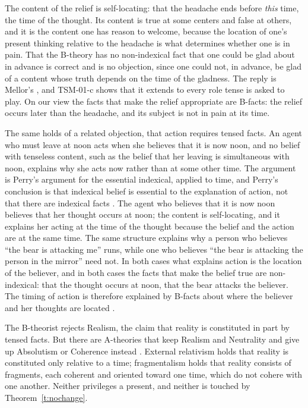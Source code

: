 \documentclass{situationist-preprint}
\begin{document}
\begin{reply}
The content of the relief is self-locating: that the headache ends before \emph{this} time, the time of the thought. Its content is true at some centers and false at others, and it is the content one has reason to welcome, because the location of one's present thinking relative to the headache is what determines whether one is in pain. That the B-theory has no non-indexical fact that one could be glad about in advance is correct and is no objection, since one could not, in advance, be glad of a content whose truth depends on the time of the gladness. The reply is Mellor's \citep{Mellor1998}, and TSM-01-c shows that it extends to every role tense is asked to play. On our view the facts that make the relief appropriate are B-facts: the relief occurs later than the headache, and its subject is not in pain at its time.

The same holds of a related objection, that action requires tensed facts. An agent who must leave at noon acts when she believes that it is now noon, and no belief with tenseless content, such as the belief that her leaving is simultaneous with noon, explains why she acts now rather than at some other time. The argument is Perry's argument for the essential indexical, applied to time, and Perry's conclusion is that indexical belief is essential to the explanation of action, not that there are indexical facts \citep{Perry1979}. The agent who believes that it is now noon believes that her thought occurs at noon; the content is self-locating, and it explains her acting at the time of the thought because the belief and the action are at the same time. The same structure explains why a person who believes \enquote{the bear is attacking me} runs, while one who believes \enquote{the bear is attacking the person in the mirror} need not. In both cases what explains action is the location of the believer, and in both cases the facts that make the belief true are non-indexical: that the thought occurs at noon, that the bear attacks the believer. The timing of action is therefore explained by B-facts about where the believer and her thoughts are located \citep{Mellor1998}.
\end{reply}

\begin{objection}\label{o:fine}
The B-theorist rejects Realism, the claim that reality is constituted in part by tensed facts. But there are A-theories that keep Realism and Neutrality and give up Absolutism or Coherence instead \citep{Fine2005}. External relativism holds that reality is constituted only relative to a time; fragmentalism holds that reality consists of fragments, each coherent and oriented toward one time, which do not cohere with one another. Neither privileges a present, and neither is touched by Theorem~\ref{t:nochange}.
\end{objection}
\end{document}
